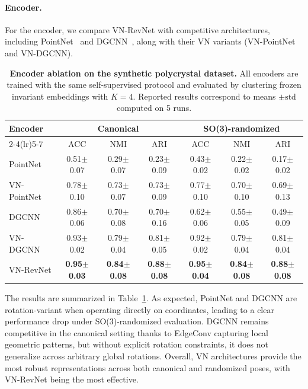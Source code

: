 \documentclass[runningheads]{llncs}
\begin{document}
\paragraph{Encoder.} For the encoder, we compare VN-RevNet with competitive architectures, including PointNet~\cite{Qi2017PointNet} and DGCNN~\cite{wang2019dgcnn}, along with their VN variants (VN-PointNet and VN-DGCNN).
\begin{table}[t]
\caption{\textbf{Encoder ablation on the synthetic polycrystal dataset.}
All encoders are trained with the same self-supervised protocol and evaluated by clustering frozen invariant embeddings with $K=4$. Reported results correspond to means $\pm{\text{std}}$ computed on 5 runs.
}
\label{tab:ablation_encoder_synth}
\centering
\footnotesize
\setlength{\tabcolsep}{3.5pt}
\renewcommand{\arraystretch}{1.05}
\newcommand{\err}[2]{#1{\scriptsize$\pm$#2}}
\begin{tabular}{@{}lcccccc@{}}
\toprule
Encoder &
\multicolumn{3}{c}{Canonical} &
\multicolumn{3}{c}{SO(3)-randomized} \\
\cmidrule(lr){2-4}\cmidrule(lr){5-7}
& ACC & NMI & ARI & ACC & NMI & ARI \\
\midrule
PointNet    & \err{0.51}{0.07} & \err{0.29}{0.07} & \err{0.23}{0.09} & \err{0.43}{0.02} & \err{0.22}{0.02} & \err{0.17}{0.02} \\
VN-PointNet & \err{0.78}{0.10} & \err{0.73}{0.07} & \err{0.73}{0.09} & \err{0.77}{0.10} & \err{0.70}{0.10} & \err{0.69}{0.13} \\
\midrule
DGCNN       & \err{0.86}{0.06} & \err{0.70}{0.08} & \err{0.70}{0.16} & \err{0.62}{0.06} & \err{0.55}{0.05} & \err{0.49}{0.09} \\
VN-DGCNN    & \err{0.93}{0.02} & \err{0.79}{0.04} & \err{0.81}{0.05} & \err{0.92}{0.02} & \err{0.79}{0.04} & \err{0.81}{0.04} \\
\midrule
VN-RevNet   & \textbf{\err{0.95}{0.03}} & \textbf{\err{0.84}{0.08}} & \textbf{\err{0.88}{0.08}} & \textbf{\err{0.95}{0.04}} & \textbf{\err{0.84}{0.08}} & \textbf{\err{0.88}{0.08}} \\
\bottomrule
\end{tabular}
\end{table}
The results are summarized in Table~\ref{tab:ablation_encoder_synth}.
As expected, PointNet and DGCNN are rotation-variant when operating directly on coordinates, leading to a clear performance drop under SO(3)-randomized evaluation. DGCNN remains competitive in the canonical setting thanks to EdgeConv capturing local geometric patterns, but without explicit rotation constraints, it does not generalize across arbitrary global rotations.
Overall, VN architectures provide the most robust representations across both canonical and randomized poses, with VN-RevNet being the most effective.
\end{document}
